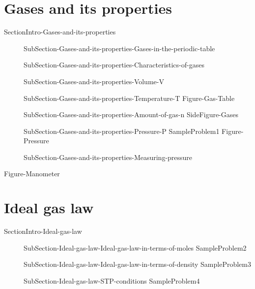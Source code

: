 \documentclass[main.tex]{subfiles}
\newcommand\chapterlabel{Ch-Gas}\setcounter{figurenewcounter}{0}\setcounter{tablenewcounter}{0}\setcounter{formulanewcounter}{0}
\begin{document}
\section{Gases and its properties} {SectionIntro-Gases-and-its-properties}
\sloppy \begin{description}
\item[]  {SubSection-Gases-and-its-properties-Gases-in-the-periodic-table}
\item[]  {SubSection-Gases-and-its-properties-Characteristics-of-gases}
 \item[] {SubSection-Gases-and-its-properties-Volume-V}
 \item[]{SubSection-Gases-and-its-properties-Temperature-T}
 {Figure-Gas-Table}
 \item[] {SubSection-Gases-and-its-properties-Amount-of-gas-n}
 {SideFigure-Gases}
\item[] {SubSection-Gases-and-its-properties-Pressure-P}
{SampleProblem1}
 {Figure-Pressure}
\item[]  {SubSection-Gases-and-its-properties-Measuring-pressure}
\end{description}



{Figure-Manometer}
\section{Ideal gas law}{SectionIntro-Ideal-gas-law}
\sloppy \begin{description}
\item[]{SubSection-Ideal-gas-law-Ideal-gas-law-in-terms-of-moles}
{SampleProblem2}
\item[]{SubSection-Ideal-gas-law-Ideal-gas-law-in-terms-of-density}
{SampleProblem3}
\item[]{SubSection-Ideal-gas-law-STP-conditions}
{SampleProblem4}
\end{description}
\end{document}
